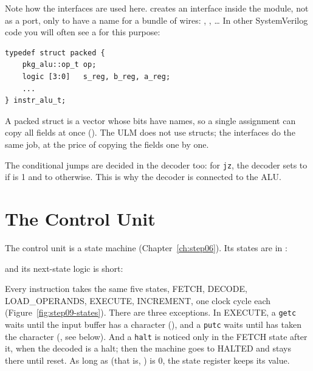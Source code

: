 Note how the interfaces are used here. 
creates an interface inside the module, not as a port, only to have a name for
a bundle of wires: , , \dots{}
In other SystemVerilog code you will often see a  for this purpose:
\begin{lstlisting}
typedef struct packed {
    pkg_alu::op_t op;
    logic [3:0]   s_reg, b_reg, a_reg;
    ...
} instr_alu_t;
\end{lstlisting}
A packed struct is a vector whose bits have names, so a single assignment can
copy all fields at once (). The ULM does not
use structs; the interfaces do the same job, at the price of copying the
fields one by one.

The conditional jumps are decided in the decoder too: for \texttt{jz}, the
decoder sets  to  if  is 1 and
to  otherwise. This is why the decoder is connected to the ALU.

\section{The Control Unit}
\label{sec:step09-cu}

The control unit  is a state machine (Chapter~\ref{ch:step06}).
Its states are in :


and its next-state logic is short:


Every instruction takes the same five states, FETCH, DECODE,
LOAD\_OPERANDS, EXECUTE, INCREMENT, one clock cycle each
(Figure~\ref{fig:step09-states}). There are three exceptions. In EXECUTE, a
\texttt{getc} waits until the input buffer has a character
(), and a \texttt{putc} waits until  has taken
the character (, see below). And a \texttt{halt} is
noticed only in the FETCH state after it, when the decoded 
is a halt; then the machine goes to HALTED and stays there until reset. As long as  (that is,
) is 0, the state register keeps its value.


